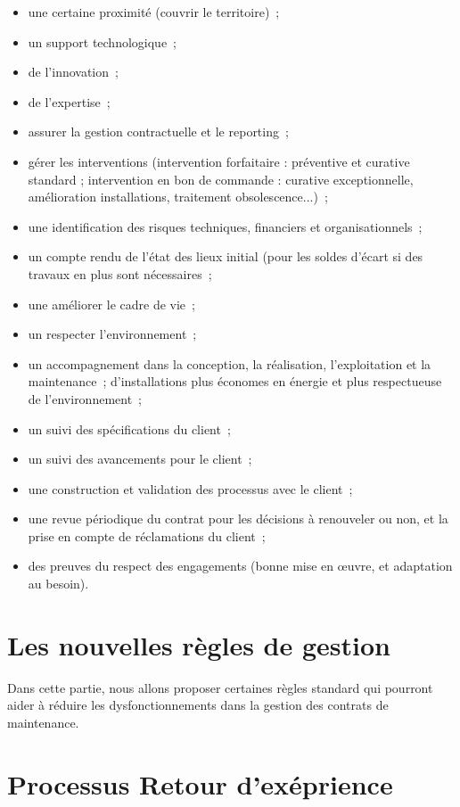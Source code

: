 \begin{itemize}
	\item une certaine proximité (couvrir le territoire)~;
	\item un support technologique~;
	\item de l'innovation~;
	\item de l'expertise~;

	\item assurer la gestion contractuelle et le reporting~;
	\item gérer les interventions (intervention forfaitaire : préventive et curative standard ; intervention en bon de commande : curative exceptionnelle, amélioration installations, traitement obsolescence...)~;
	\item une identification des risques techniques, financiers et organisationnels~;
	\item un compte rendu de l'état des lieux initial (pour les soldes d'écart si des travaux en plus sont nécessaires~;

	\item une améliorer le cadre de vie~;
	\item un respecter l'environnement~;

	\item un accompagnement dans la conception, la réalisation, l'exploitation et la maintenance~; d'installations plus économes en énergie et plus respectueuse de l'environnement~;
	\item un suivi des spécifications du client~;
	\item un suivi des avancements pour le client~;
	\item une construction et validation des processus avec le client~;
	\item une revue périodique du contrat pour les décisions à renouveler ou non, et la prise en compte de réclamations du client~;
	\item des preuves du respect des engagements (bonne mise en œuvre, et adaptation au besoin).
\end{itemize}


\section{Les nouvelles règles de gestion}
Dans cette partie, nous allons proposer certaines règles standard qui pourront aider à réduire les dysfonctionnements dans la gestion des contrats de maintenance.


\section{Processus Retour d'exéprience}

